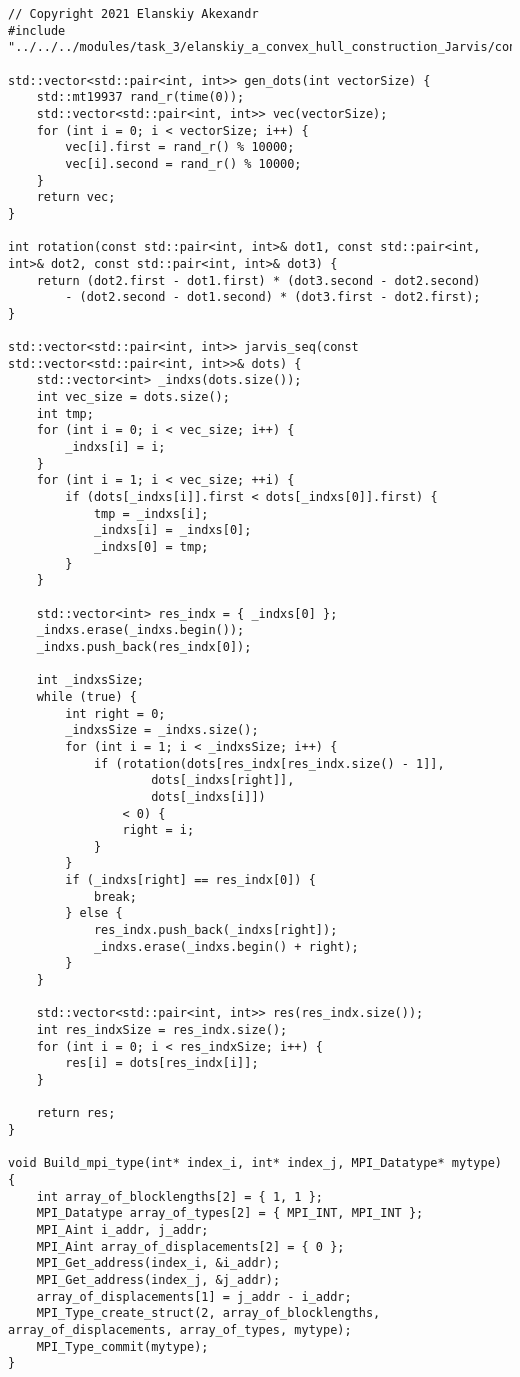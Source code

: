 \documentclass{report}
\begin{document}
\begin{lstlisting}
// Copyright 2021 Elanskiy Akexandr
#include "../../../modules/task_3/elanskiy_a_convex_hull_construction_Jarvis/convex_hull_construction_Jarvis.h"

std::vector<std::pair<int, int>> gen_dots(int vectorSize) {
    std::mt19937 rand_r(time(0));
    std::vector<std::pair<int, int>> vec(vectorSize);
    for (int i = 0; i < vectorSize; i++) {
        vec[i].first = rand_r() % 10000;
        vec[i].second = rand_r() % 10000;
    }
    return vec;
}

int rotation(const std::pair<int, int>& dot1, const std::pair<int, int>& dot2, const std::pair<int, int>& dot3) {
    return (dot2.first - dot1.first) * (dot3.second - dot2.second)
        - (dot2.second - dot1.second) * (dot3.first - dot2.first);
}

std::vector<std::pair<int, int>> jarvis_seq(const std::vector<std::pair<int, int>>& dots) {
    std::vector<int> _indxs(dots.size());
    int vec_size = dots.size();
    int tmp;
    for (int i = 0; i < vec_size; i++) {
        _indxs[i] = i;
    }
    for (int i = 1; i < vec_size; ++i) {
        if (dots[_indxs[i]].first < dots[_indxs[0]].first) {
            tmp = _indxs[i];
            _indxs[i] = _indxs[0];
            _indxs[0] = tmp;
        }
    }

    std::vector<int> res_indx = { _indxs[0] };
    _indxs.erase(_indxs.begin());
    _indxs.push_back(res_indx[0]);

    int _indxsSize;
    while (true) {
        int right = 0;
        _indxsSize = _indxs.size();
        for (int i = 1; i < _indxsSize; i++) {
            if (rotation(dots[res_indx[res_indx.size() - 1]],
                    dots[_indxs[right]],
                    dots[_indxs[i]])
                < 0) {
                right = i;
            }
        }
        if (_indxs[right] == res_indx[0]) {
            break;
        } else {
            res_indx.push_back(_indxs[right]);
            _indxs.erase(_indxs.begin() + right);
        }
    }

    std::vector<std::pair<int, int>> res(res_indx.size());
    int res_indxSize = res_indx.size();
    for (int i = 0; i < res_indxSize; i++) {
        res[i] = dots[res_indx[i]];
    }

    return res;
}

void Build_mpi_type(int* index_i, int* index_j, MPI_Datatype* mytype) {
    int array_of_blocklengths[2] = { 1, 1 };
    MPI_Datatype array_of_types[2] = { MPI_INT, MPI_INT };
    MPI_Aint i_addr, j_addr;
    MPI_Aint array_of_displacements[2] = { 0 };
    MPI_Get_address(index_i, &i_addr);
    MPI_Get_address(index_j, &j_addr);
    array_of_displacements[1] = j_addr - i_addr;
    MPI_Type_create_struct(2, array_of_blocklengths, array_of_displacements, array_of_types, mytype);
    MPI_Type_commit(mytype);
}


\end{lstlisting}
\end{document}
